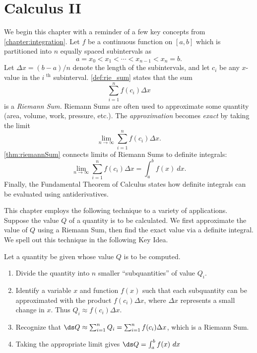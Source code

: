 \part{Calculus II}


We begin this chapter with a reminder of a few key concepts from \autoref{chapter:integration}. Let $f$ be a continuous function on $[a,b]$ which is partitioned into $n$ equally spaced subintervals as 
\[a=x_0 < x_1 < \cdots < x_{n-1}<x_n=b.\]
Let $\Delta x=(b-a)/n$ denote the length of the  subintervals, and let $c_i$ be any $x$-value in the $i^\text{ th}$ subinterval. \autoref{def:rie_sum} states that the sum
\[\sum_{i=1}^n f(c_i)\Delta x\]
is a \textit{Riemann Sum.} Riemann Sums are often used to approximate some quantity (area, volume, work, pressure, etc.). The \textit{approximation} becomes \textit{exact} by taking the limit 
\[\lim_{n\to\infty} \sum_{i=1}^n f(c_i)\Delta x.\]
\autoref{thm:riemannSum} connects limits of Riemann Sums to definite integrals:
\[\lim_{n\to\infty} \sum_{i=1}^n f(c_i)\Delta x = \int_a^b f(x)\ dx.\]
Finally, the Fundamental Theorem of Calculus states how definite integrals can be evaluated using antiderivatives. 

This chapter employs the following technique to a variety of applications. Suppose the value $Q$ of a quantity is to be calculated. We first approximate the value of $Q$ using a Riemann Sum, then find the exact value via a definite integral. We spell out this technique in the following Key Idea.

{Let a quantity be given whose value $Q$ is to be computed.
\begin{enumerate}
\item	Divide the quantity into $n$ smaller ``subquantities'' of value $Q_i$.
\item	Identify a variable $x$ and function $f(x)$ such that each subquantity can be approximated with the product $f(c_i)\Delta x$, where $\Delta x$ represents a small change in $x$. Thus $Q_i \approx f(c_i)\Delta x$.
\item	Recognize that $\ds Q\approx \sum_{i=1}^n Q_i = \sum_{i=1}^n f(c_i)\Delta x$, which is a Riemann Sum.
\item	Taking the appropriate limit gives $\ds Q = \int_a^b f(x)\ dx$
\end{enumerate}}

